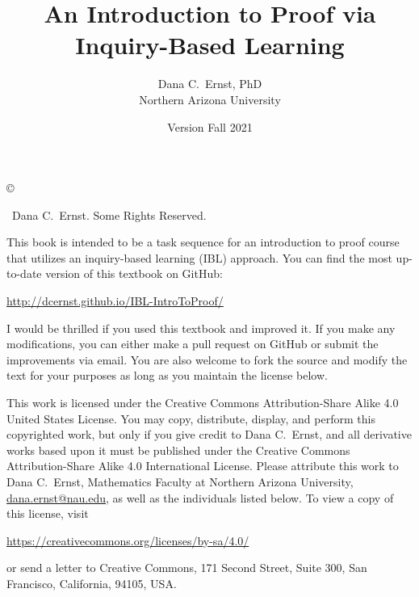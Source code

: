 \documentclass[12pt,oneside]{book}
\theoremstyle{definition}
\begin{document}
\title{An Introduction to Proof via \\Inquiry-Based Learning}
\author{Dana C.~Ernst, PhD\\
Northern Arizona University}
\date{Version Fall 2021}

\maketitle
\thispagestyle{empty}

\noindent\copyright{ \the\year\ Dana C.~Ernst.  Some Rights Reserved.\\

\bigskip

\noindent This book is intended to be a task sequence for an introduction to proof course that utilizes an inquiry-based learning (IBL) approach.  You can find the most up-to-date version of this textbook on GitHub:
\begin{center}
\url{http://dcernst.github.io/IBL-IntroToProof/}
\end{center}
I would be thrilled if you used this textbook and improved it. If you make any modifications, you can either make a pull request on GitHub or submit the improvements via email.  You are also welcome to fork the source and modify the text for your purposes as long as you maintain the license below.

\bigskip

\noindent This work is licensed under the Creative Commons Attribution-Share Alike 4.0 United States License.  You may copy, distribute, display, and perform this copyrighted work, but only if you give credit to Dana C.~Ernst, and all derivative works based upon it must be published under the Creative Commons Attribution-Share Alike 4.0 International License. Please attribute this work to Dana C.~Ernst, Mathematics Faculty at Northern Arizona University, \url{dana.ernst@nau.edu}, as well as the individuals listed below. To view a copy of this license, visit
\begin{center}
\url{https://creativecommons.org/licenses/by-sa/4.0/}
\end{center}
or send a letter to Creative Commons, 171 Second Street, Suite 300, San Francisco, California, 94105, USA.}

\medskip

\begin{center}
\ccbysa
\end{center}

\bigskip

\tableofcontents
\end{document}
